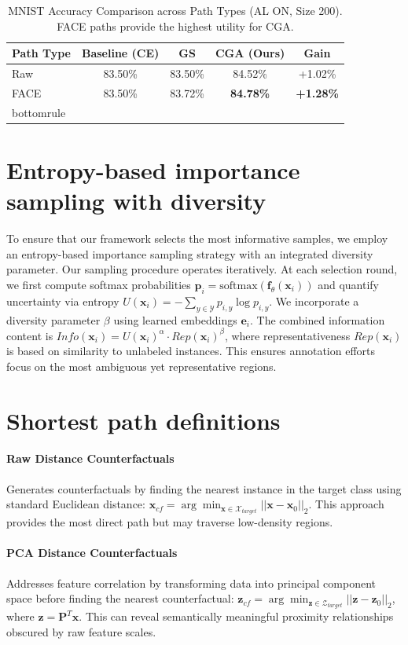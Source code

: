 \documentclass[sigconf,anonymous]{aamas}
\begin{document}
\begin{table}[h]
\centering
\caption{MNIST Accuracy Comparison across Path Types (AL ON, Size 200). FACE paths provide the highest utility for CGA.}
\label{tab:mnist_paths}
\begin{tabular}{lcccc}
\toprule
\textbf{Path Type} & \textbf{Baseline (CE)} & \textbf{GS \cite{teney2020learning}} & \textbf{CGA (Ours)} & \textbf{Gain} \\ \midrule
Raw & 83.50\% & 83.50\% & 84.52\% & +1.02\%
 \\FACE & 83.50\% & 83.72\% & \textbf{84.78\%} & \textbf{+1.28\%} \\bottomrule
\end{tabular}
\end{table}

\section{Entropy-based importance sampling with diversity}
\label{appendix:al}
To ensure that our framework selects the most informative samples, we employ an entropy-based importance sampling strategy with an integrated diversity parameter. Our sampling procedure operates iteratively. At each selection round, we first compute softmax probabilities $\mathbf{p}_i = \text{softmax}(\mathbf{f}_\theta(\mathbf{x}_i))$ and quantify uncertainty via entropy $U(\mathbf{x}_i) = -\sum_{y \in \mathcal{Y}} p_{i,y} \log p_{i,y}$. We incorporate a diversity parameter $\beta$ using learned embeddings $\mathbf{e}_i$. The combined information content is $Info(\mathbf{x}_i) = U(\mathbf{x}_i)^\alpha \cdot Rep(\mathbf{x}_i)^\beta$, where representativeness $Rep(\mathbf{x}_i)$ is based on similarity to unlabeled instances. This ensures annotation efforts focus on the most ambiguous yet representative regions.

\section{Shortest path definitions}
\paragraph{Raw Distance Counterfactuals}
Generates counterfactuals by finding the nearest instance in the target class using standard Euclidean distance: $\mathbf{x}_{cf} = \arg\min_{\mathbf{x} \in \mathcal{X}_{target}} ||\mathbf{x} - \mathbf{x}_0||_2$. This approach provides the most direct path but may traverse low-density regions.

\paragraph{PCA Distance Counterfactuals}
Addresses feature correlation by transforming data into principal component space before finding the nearest counterfactual: $\mathbf{z}_{cf} = \arg\min_{\mathbf{z} \in \mathcal{Z}_{target}} ||\mathbf{z} - \mathbf{z}_0||_2$, where $\mathbf{z} = \mathbf{P}^T\mathbf{x}$. This can reveal semantically meaningful proximity relationships obscured by raw feature scales.
\end{document}
